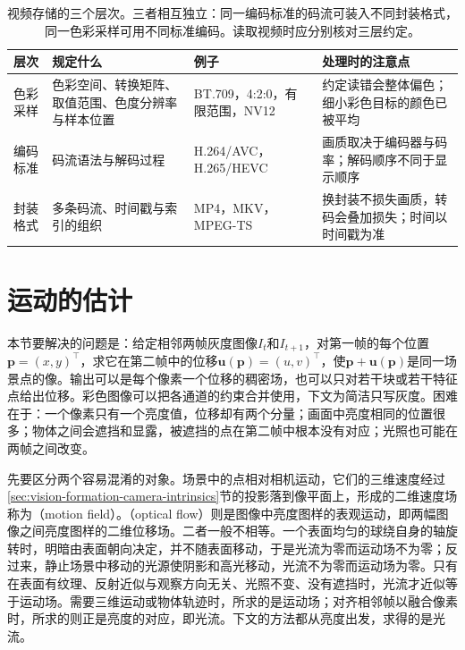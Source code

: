 \begin{table}[htbp]
  \centering
  \small
  \begin{tabularx}{\linewidth}{@{}lXXX@{}}
    \toprule
    层次 & 规定什么 & 例子 & 处理时的注意点\\
    \midrule
    色彩采样 & 色彩空间、转换矩阵、取值范围、色度分辨率与样本位置 & BT.709，4:2:0，有限范围，NV12 & 约定读错会整体偏色；细小彩色目标的颜色已被平均\\
    编码标准 & 码流语法与解码过程 & H.264/AVC，H.265/HEVC & 画质取决于编码器与码率；解码顺序不同于显示顺序\\
    封装格式 & 多条码流、时间戳与索引的组织 & MP4，MKV，MPEG-TS & 换封装不损失画质，转码会叠加损失；时间以时间戳为准\\
    \bottomrule
  \end{tabularx}
  \caption{视频存储的三个层次。三者相互独立：同一编码标准的码流可装入不同封装格式，同一色彩采样可用不同标准编码。读取视频时应分别核对三层约定。}
  \label{tab:vision-videofound-format-layers}
\end{table}

\section{运动的估计}
\label{sec:vision-videofound-motion}

本节要解决的问题是：给定相邻两帧灰度图像$I_t$和$I_{t+1}$，对第一帧的每个位置$\bm p=(x,y)^\top$，求它在第二帧中的位移$\bm u(\bm p)=(u,v)^\top$，使$\bm p+\bm u(\bm p)$是同一场景点的像。输出可以是每个像素一个位移的稠密场，也可以只对若干块或若干特征点给出位移。彩色图像可以把各通道的约束合并使用，下文为简洁只写灰度。困难在于：一个像素只有一个亮度值，位移却有两个分量；画面中亮度相同的位置很多；物体之间会遮挡和显露，被遮挡的点在第二帧中根本没有对应；光照也可能在两帧之间改变。

先要区分两个容易混淆的对象。场景中的点相对相机运动，它们的三维速度经过\ref{sec:vision-formation-camera-intrinsics}节的投影落到像平面上，形成的二维速度场称为（motion field）。（optical flow）则是图像中亮度图样的表观运动，即两幅图像之间亮度图样的二维位移场。二者一般不相等。一个表面均匀的球绕自身的轴旋转时，明暗由表面朝向决定，并不随表面移动，于是光流为零而运动场不为零；反过来，静止场景中移动的光源使阴影和高光移动，光流不为零而运动场为零。只有在表面有纹理、反射近似与观察方向无关、光照不变、没有遮挡时，光流才近似等于运动场。需要三维运动或物体轨迹时，所求的是运动场；对齐相邻帧以融合像素时，所求的则正是亮度的对应，即光流。下文的方法都从亮度出发，求得的是光流。

